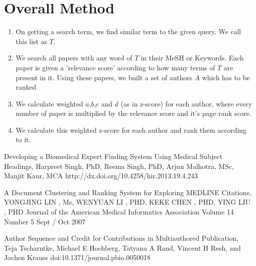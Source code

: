 \documentclass[paper=a4, fontsize=11pt]{scrartcl}
\numberwithin{equation}{section}		%
\numberwithin{figure}{section}			%
\numberwithin{table}{section}				%
\begin{document}
\section{Overall Method}
\begin{enumerate}
\item On getting a search term, we find similar term to the given query. We call this list as $T$.
\item We search all papers with any word of $T$ in their MeSH or Keywords. Each paper is given a 'relevance score' according to how many terms of $T$ are present in it. Using these papers, we built a set of authors $A$ which has to be ranked
\item We calculate weighted $a$,$b$,$c$ and $d$ (as in z-score) for each author, where every number of paper is multiplied by the relevance score and it's page rank score.
\item We calculate this weighted z-score for each author and rank them according to it.
\end{enumerate}

%

\begin{thebibliography}{9}

 {Developing a Biomedical Expert Finding System
Using Medical Subject Headings, Harpreet Singh, PhD, Reema Singh, PhD, Arjun Malhotra, MSc, Manjit Kaur, MCA http://dx.doi.org/10.4258/hir.2013.19.4.243}

 {A Document Clustering and Ranking System for Exploring
MEDLINE Citations, YONGJING LIN , Ms, WENYUAN LI , PHD, KEKE CHEN , PHD, YING LIU , PHD Journal of the American Medical Informatics Association Volume 14 Number 5 Sept / Oct 2007 }

 {Author Sequence and Credit for Contributions in Multiauthored Publication, Teja Tscharntke, Michael E Hochberg, Tatyana A Rand, Vincent H Resh, and Jochen Krauss doi:10.1371/journal.pbio.0050018}

\end{thebibliography}
\end{document}
